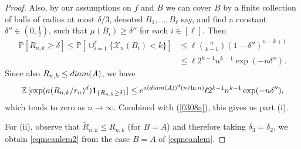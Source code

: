 \documentclass[10pt,a4paper]{amsart}
\newcommand{\E}{\mathbb E \,}
\newcommand{\X}{\mathcal{X}}
\newcommand{\diam}{{\rm diam}}
\newcommand{\tR}{{\tilde{R}}}
\renewcommand{\Pr}{\mathbb{P}}
\renewcommand{\log}{{\ln \:}}
\begin{document}
\begin{proof}
Also, by our assumptions on $f$ and $B$ we can cover $B$ by 
 a finite collection
of balls of radius at most $\delta/3$, denoted $B_1,\ldots,B_\ell$ say,
and find a constant $\delta'' \in (0,\frac12)$,
such that $\mu(B_i) \geq \delta''$ for each $i \in [\ell]$. Then 
\begin{align*}
\Pr[R_{n,k}  \geq \delta] \leq \Pr[ \cup_{i=1}^\ell
\{ \X_n ( B_i) < k \} ] & \leq  \ell \binom{n}{k-1} 
(1- \delta'')^{n-k+1} 
\\
& \leq   \ell 2^{k-1} n^{k-1} \exp(-n \delta'').
\end{align*}  
Since also $R_{n,k} \leq \diam(A)$, 
we have
	\begin{align*}
\E[ \exp(a (R_{n,k}/r_n)^d ) {\bf 1}_{\{R_{n,k} \geq \delta \}} ]
\leq 
		e^{a (\diam (A))^d (n / \log n) } \ell 2^{k-1} 
		n^{k-1} \exp(-n \delta''),
	\end{align*}
which tends to zero as $n \to \infty$.
Combined with (\ref{0308a}), this gives us part (i).

For (ii), observe that $\tR_{n,k} \leq R_{n,k}$
(for $B=A$) and therefore taking $\delta_3 = \delta_2$,
we obtain \eqref{eqmeanlem2} from the case $B=A$ of 
\eqref{eqmeanlem}.
\end{proof}
\end{document}
